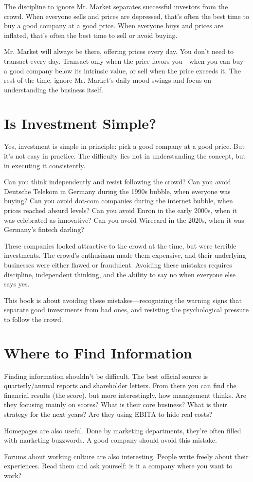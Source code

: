 The discipline to ignore Mr. Market separates successful investors from the crowd. When everyone sells and prices are depressed, that's often the best time to buy a good company at a good price. When everyone buys and prices are inflated, that's often the best time to sell or avoid buying.

Mr. Market will always be there, offering prices every day. You don't need to transact every day. Transact only when the price favors you—when you can buy a good company below its intrinsic value, or sell when the price exceeds it. The rest of the time, ignore Mr. Market's daily mood swings and focus on understanding the business itself.

\section*{Is Investment Simple?}

Yes, investment is simple in principle: pick a good company at a good price. But it's not easy in practice. The difficulty lies not in understanding the concept, but in executing it consistently.

Can you think independently and resist following the crowd? Can you avoid Deutsche Telekom in Germany during the 1990s bubble, when everyone was buying? Can you avoid dot-com companies during the internet bubble, when prices reached absurd levels? Can you avoid Enron in the early 2000s, when it was celebrated as innovative? Can you avoid Wirecard in the 2020s, when it was Germany's fintech darling?

These companies looked attractive to the crowd at the time, but were terrible investments. The crowd's enthusiasm made them expensive, and their underlying businesses were either flawed or fraudulent. Avoiding these mistakes requires discipline, independent thinking, and the ability to say no when everyone else says yes.

This book is about avoiding these mistakes—recognizing the warning signs that separate good investments from bad ones, and resisting the psychological pressure to follow the crowd.

\section*{Where to Find Information}
Finding information shouldn't be difficult. 
The best official source is quarterly/annual reports and shareholder letters.
From there you can find the financial results (the score), but more interestingly, 
how management thinks. Are they focusing mainly on scores?
What is their core business? What is their strategy for the next years? Are they using 
EBITA to hide real costs?

Homepages are also useful. Done by marketing departments, 
they're often filled with marketing buzzwords. A good company should avoid this mistake.

Forums about working culture are also interesting. People write freely 
about their experiences. Read them and ask yourself: is it a company where you want to work?